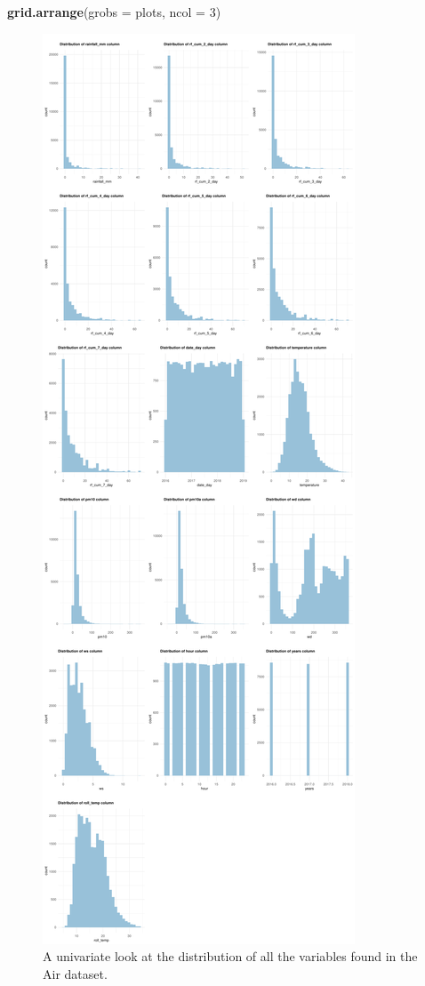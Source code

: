 \documentclass[12pt]{article}
\newenvironment{Shaded}{\begin{snugshade}}{\end{snugshade}}
\newcommand{\DataTypeTok}[1]{\textcolor[rgb]{0.13,0.29,0.53}{#1}}
\newcommand{\DecValTok}[1]{\textcolor[rgb]{0.00,0.00,0.81}{#1}}
\newcommand{\KeywordTok}[1]{\textcolor[rgb]{0.13,0.29,0.53}{\textbf{#1}}}
\newcommand{\NormalTok}[1]{#1}
\begin{document}
\begin{Shaded}
\begin{Highlighting}[]
\KeywordTok{grid.arrange}\NormalTok{(}\DataTypeTok{grobs =}\NormalTok{ plots, }\DataTypeTok{ncol =} \DecValTok{3}\NormalTok{)}
\end{Highlighting}
\end{Shaded}

\begin{figure}
\centering
\includegraphics{MATH2269_final_project_files/figure-latex/Univariate distribution-1.pdf}
\caption{A univariate look at the distribution of all the variables
found in the Air dataset.}
\end{figure}
\end{document}
